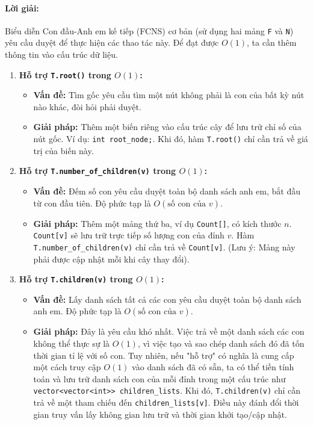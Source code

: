\documentclass[a4paper,12pt]{article}
\begin{document}
\paragraph{Lời giải:}
Biểu diễn Con đầu-Anh em kế tiếp (FCNS) cơ bản (sử dụng hai mảng \texttt{F} và \texttt{N}) yêu cầu duyệt để thực hiện các thao tác này. Để đạt được $O(1)$, ta cần thêm thông tin vào cấu trúc dữ liệu.
\begin{enumerate}
    \item \textbf{Hỗ trợ \texttt{T.root()} trong $O(1)$:}
        \begin{itemize}
            \item \textbf{Vấn đề:} Tìm gốc yêu cầu tìm một nút không phải là con của bất kỳ nút nào khác, đòi hỏi phải duyệt.
            \item \textbf{Giải pháp:} Thêm một biến riêng vào cấu trúc cây để lưu trữ chỉ số của nút gốc. Ví dụ: \texttt{int root\_node;}. Khi đó, hàm \texttt{T.root()} chỉ cần trả về giá trị của biến này.
        \end{itemize}
    \item \textbf{Hỗ trợ \texttt{T.number\_of\_children(v)} trong $O(1)$:}
        \begin{itemize}
            \item \textbf{Vấn đề:} Đếm số con yêu cầu duyệt toàn bộ danh sách anh em, bắt đầu từ con đầu tiên. Độ phức tạp là $O(\text{số con của } v)$.
            \item \textbf{Giải pháp:} Thêm một mảng thứ ba, ví dụ \texttt{Count[]}, có kích thước $n$. \texttt{Count[v]} sẽ lưu trữ trực tiếp số lượng con của đỉnh $v$. Hàm \texttt{T.number\_of\_children(v)} chỉ cần trả về \texttt{Count[v]}. (Lưu ý: Mảng này phải được cập nhật mỗi khi cây thay đổi).
        \end{itemize}
    \item \textbf{Hỗ trợ \texttt{T.children(v)} trong $O(1)$:}
        \begin{itemize}
            \item \textbf{Vấn đề:} Lấy danh sách tất cả các con yêu cầu duyệt toàn bộ danh sách anh em. Độ phức tạp là $O(\text{số con của } v)$.
            \item \textbf{Giải pháp:} Đây là yêu cầu khó nhất. Việc trả về một danh sách các con không thể thực sự là $O(1)$, vì việc tạo và sao chép danh sách đó đã tốn thời gian tỉ lệ với số con. Tuy nhiên, nếu "hỗ trợ" có nghĩa là cung cấp một cách truy cập $O(1)$ vào danh sách đã có sẵn, ta có thể tiền tính toán và lưu trữ danh sách con của mỗi đỉnh trong một cấu trúc như \texttt{vector<vector<int>> children\_lists}. Khi đó, \texttt{T.children(v)} chỉ cần trả về một tham chiếu đến \texttt{children\_lists[v]}. Điều này đánh đổi thời gian truy vấn lấy không gian lưu trữ và thời gian khởi tạo/cập nhật.
        \end{itemize}
\end{enumerate}
\end{document}
